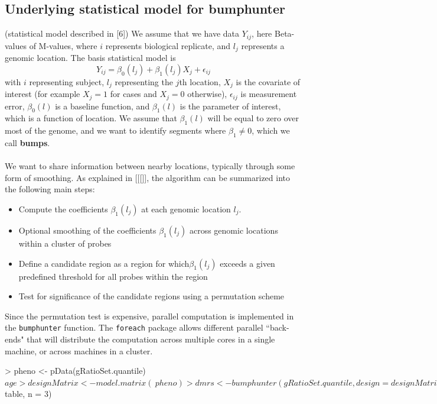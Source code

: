 \documentclass[12pt]{article}
\begin{document}
 \subsection*{Underlying statistical model for bumphunter}
(statistical model described in [6]) We assume that we have data $Y_{ij}$, here Beta-values of M-values, where $i$ represents biological replicate, and $l_j$ represents a genomic location. The basis statistical model is 
\begin{equation*}
Y_{ij} = \beta_0(l_j) + \beta_1(l_j)X_j + \epsilon_{ij}
\end{equation*}
with $i$ representing subject, $l_j$ representing the $j$th location, $X_j$ is the covariate of interest (for example $X_j=1$ for cases and $X_j=0$ otherwise), $\epsilon_{ij}$ is measurement error, $\beta_0(l)$ is a baseline function, and $\beta_1(l)$ is the parameter of interest, which is a function of location. We assume that $\beta_1(l)$ will be equal to zero over most of the genome, and we want to identify segments where $\beta_1 \not = 0$, which we call \textbf{bumps}. 
\\
\\
We want to share information between nearby locations, typically through some form of smoothing. As explained in [[[]], the algorithm can be summarized into the following main steps:
\begin{itemize}
\item[A.] Compute the coefficients $\beta_1(l_j)$ at each genomic location $l_j$.
\item[B.] Optional smoothing of the coefficients $\beta_1(l_j)$ across genomic locations within a cluster of probes
\item[C.] Define a candidate region as a region for which$\beta_1(l_j)$ exceeds a given predefined threshold for all probes within the region
\item[D.] Test for significance of the candidate regions using a permutation scheme 
\end{itemize}
Since the permutation test is expensive, parallel computation is implemented in the \texttt{bumphunter} function. The \texttt{foreach} package allows different parallel ``back-ends" that will distribute the computation across multiple cores in a single machine, or across machines in a cluster. 

\begin{Schunk}
\begin{Sinput}
> pheno <- pData(gRatioSet.quantile)$age
> designMatrix <- model.matrix(~ pheno)
> dmrs <- bumphunter(gRatioSet.quantile, design = designMatrix, cutoff = 0.05, B=1)
> names(dmrs)
> head(dmrs$table, n = 3)
\end{Sinput}
\end{Schunk}
\end{document}
